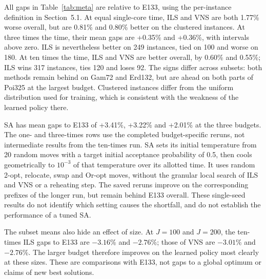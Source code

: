 \documentclass[preprint,12pt,authoryear]{elsarticle}
\begin{document}
All gaps in Table~\ref{tab:meta} are relative to E133, using the per-instance definition in Section~5.1. At equal single-core time, ILS and VNS are both 1.77\% worse overall, but are 0.81\% and 0.80\% better on the clustered instances. At three times the time, their mean gaps are +0.35\% and +0.36\%, with intervals above zero. ILS is nevertheless better on 249 instances, tied on 100 and worse on 180. At ten times the time, ILS and VNS are better overall, by 0.60\% and 0.55\%; ILS wins 317 instances, ties 120 and loses 92. The signs differ across subsets: both methods remain behind on Gam72 and Erd132, but are ahead on both parts of Poi325 at the largest budget. Clustered instances differ from the uniform distribution used for training, which is consistent with the weakness of the learned policy there.

SA has mean gaps to E133 of +3.41\%, +3.22\% and +2.01\% at the three budgets. The one- and three-times rows use the completed budget-specific reruns, not intermediate results from the ten-times run. SA sets its initial temperature from 20 random moves with a target initial acceptance probability of 0.5, then cools geometrically to $10^{-3}$ of that temperature over its allotted time. It uses random 2-opt, relocate, swap and Or-opt moves, without the granular local search of ILS and VNS or a reheating step. The saved reruns improve on the corresponding prefixes of the longer run, but remain behind E133 overall. These single-seed results do not identify which setting causes the shortfall, and do not establish the performance of a tuned SA.

The subset means also hide an effect of size. At $J = 100$ and $J = 200$, the ten-times ILS gaps to E133 are $-3.16$\% and $-2.76$\%; those of VNS are $-3.01$\% and $-2.76$\%. The larger budget therefore improves on the learned policy most clearly at these sizes. These are comparisons with E133, not gaps to a global optimum or claims of new best solutions.
\end{document}
